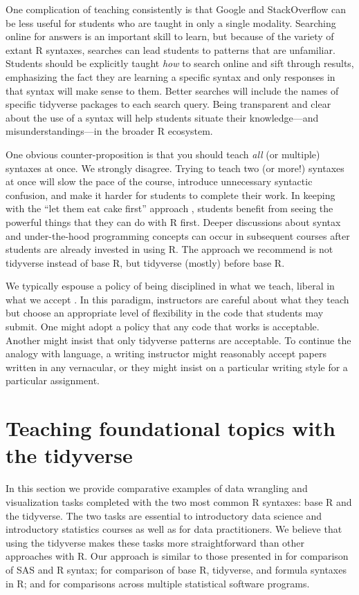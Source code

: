 \documentclass[12pt]{article}
\begin{document}
One complication of teaching consistently is that Google and
StackOverflow can be less useful for students who are taught in only a
single modality. Searching online for answers is an important skill to
learn, but because of the variety of extant R syntaxes, searches can
lead students to patterns that are unfamiliar. Students should be
explicitly taught \emph{how} to search online and sift through results,
emphasizing the fact they are learning a specific syntax and only
responses in that syntax will make sense to them. Better searches will
include the names of specific tidyverse packages to each search query.
Being transparent and clear about the use of a syntax will help students
situate their knowledge---and misunderstandings---in the broader R
ecosystem.

One obvious counter-proposition is that you should teach \emph{all} (or
multiple) syntaxes at once. We strongly disagree. Trying to teach two
(or more!) syntaxes at once will slow the pace of the course, introduce
unnecessary syntactic confusion, and make it harder for students to
complete their work. In keeping with the ``let them eat cake first''
approach \citep{cetinkaya2020fresh, wang2017}, students benefit from
seeing the powerful things that they can do with R first. Deeper
discussions about syntax and under-the-hood programming concepts can
occur in subsequent courses after students are already invested in using
R. The approach we recommend is not tidyverse instead of base R, but
tidyverse (mostly) before base R.

We typically espouse a policy of being disciplined in what we teach,
liberal in what we accept \citep{postel1980dod}. In this paradigm,
instructors are careful about what they teach but choose an appropriate
level of flexibility in the code that students may submit. One might
adopt a policy that any code that works is acceptable. Another might
insist that only tidyverse patterns are acceptable. To continue the
analogy with language, a writing instructor might reasonably accept
papers written in any vernacular, or they might insist on a particular
writing style for a particular assignment.

\hypertarget{sec:tidyverse}{%
\section{Teaching foundational topics with the
tidyverse}\label{sec:tidyverse}}

In this section we provide comparative examples of data wrangling and
visualization tasks completed with the two most common R syntaxes: base
R and the tidyverse. The two tasks are essential to introductory data
science and introductory statistics courses as well as for data
practitioners. We believe that using the tidyverse makes these tasks
more straightforward than other approaches with R. Our approach is
similar to those presented in \citet{kleinman2009sas} for comparison of
SAS and R syntax; \citet{mcnamaraamelia2021} for comparison of base R,
tidyverse, and formula syntaxes in R; and \citet{dierker2021} for
comparisons across multiple statistical software programs.
\end{document}
